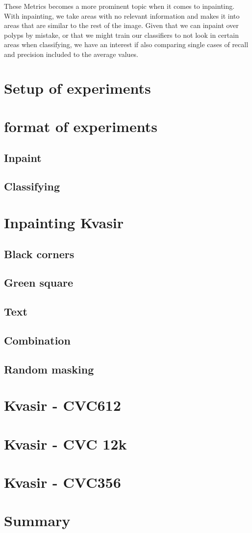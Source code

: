 These Metrics becomes a more prominent topic when it comes to inpainting. With inpainting, we take areas with no relevant information and makes it into areas that are similar to the rest of the image. Given that we can inpaint over polyps by mistake, or that we might train our classifiers to not look in certain areas when classifying, we have an interest if also comparing single cases of recall and precision included to the average values.







\section{Setup of experiments}



\section{format of experiments}
    \subsection{Inpaint}
    \subsection{Classifying}
    
\section{Inpainting Kvasir}
    \subsection{Black corners}
    \subsection{Green square}
    \subsection{Text}
    \subsection{Combination}
    \subsection{Random masking}
    
\section{Kvasir -  CVC612}
\section{Kvasir -  CVC 12k}
\section{Kvasir -  CVC356}

\section{Summary
}

